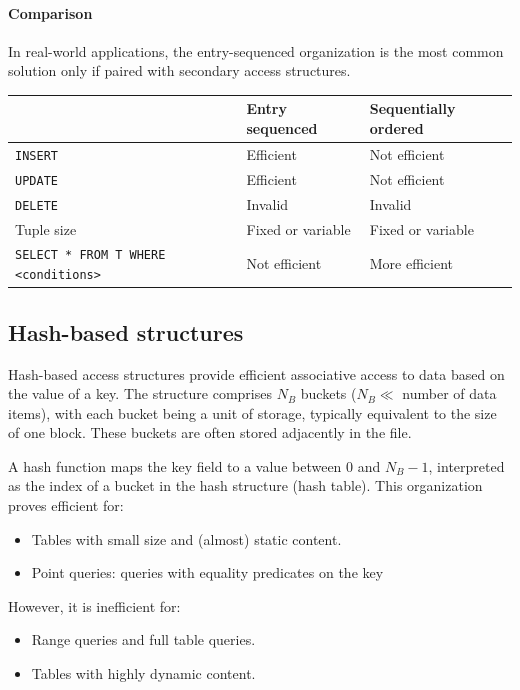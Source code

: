 \paragraph*{Comparison}
In real-world applications, the entry-sequenced organization is the most common solution only if paired with secondary access structures.
\begin{table}[H]
    \centering
    \begin{tabular}{l|ll|}
    \cline{2-3}
    \textbf{}                                                         & \textbf{Entry sequenced} & \textbf{Sequentially ordered} \\ \hline
    \multicolumn{1}{|l|}{\texttt{INSERT}}                             & Efficient                & Not efficient                 \\
    \multicolumn{1}{|l|}{\texttt{UPDATE}}                             & Efficient                & Not efficient                 \\
    \multicolumn{1}{|l|}{\texttt{DELETE}}                             & Invalid                  & Invalid                       \\
    \multicolumn{1}{|l|}{Tuple size}                                  & Fixed or variable        & Fixed or variable             \\
    \multicolumn{1}{|l|}{\texttt{SELECT * FROM T WHERE <conditions>}} & Not efficient            & More efficient                \\ \hline
    \end{tabular}
\end{table}

\subsection{Hash-based structures}
Hash-based access structures provide efficient associative access to data based on the value of a key. 
The structure comprises $N_B$ buckets ($N_B \ll$ number of data items), with each bucket being a unit of storage, typically equivalent to the size of one block. 
These buckets are often stored adjacently in the file.

A hash function maps the key field to a value between 0 and $N_B-1$, interpreted as the index of a bucket in the hash structure (hash table). 
This organization proves efficient for:
\begin{itemize}
    \item Tables with small size and (almost) static content. 
    \item Point queries: queries with equality predicates on the key
\end{itemize}
However, it is inefficient for:
\begin{itemize}
    \item Range queries and full table queries.
    \item Tables with highly dynamic content.
\end{itemize}

